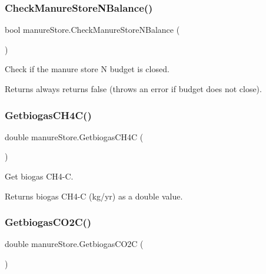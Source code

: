 \subsubsection{\texorpdfstring{CheckManureStoreNBalance()}{CheckManureStoreNBalance()}}
{\footnotesize\ttfamily bool manure\+Store.\+Check\+Manure\+Store\+N\+Balance (\begin{DoxyParamCaption}{ }\end{DoxyParamCaption})\hspace{0.3cm}{\ttfamily [inline]}}



Check if the manure store N budget is closed. 

\begin{DoxyReturn}{Returns}
always returns false (throws an error if budget does not close). 
\end{DoxyReturn}
\mbox{\label{classmanure_store_a634f58e84c82d2ef7110cd1081a41c17}} 
\subsubsection{\texorpdfstring{GetbiogasCH4C()}{GetbiogasCH4C()}}
{\footnotesize\ttfamily double manure\+Store.\+Getbiogas\+C\+H4C (\begin{DoxyParamCaption}{ }\end{DoxyParamCaption})\hspace{0.3cm}{\ttfamily [inline]}}



Get biogas C\+H4-\/C. 

\begin{DoxyReturn}{Returns}
biogas C\+H4-\/C (kg/yr) as a double value. 
\end{DoxyReturn}
\mbox{\label{classmanure_store_af22fab8168a04dc58b1867edf8156d8b}} 
\subsubsection{\texorpdfstring{GetbiogasCO2C()}{GetbiogasCO2C()}}
{\footnotesize\ttfamily double manure\+Store.\+Getbiogas\+C\+O2C (\begin{DoxyParamCaption}{ }\end{DoxyParamCaption})\hspace{0.3cm}{\ttfamily [inline]}}



